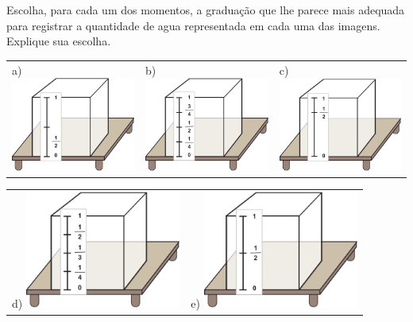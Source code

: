 Escolha, para cada um dos momentos, a graduação que lhe parece mais adequada para registrar a quantidade de agua representada em cada uma das imagens. Explique sua escolha.


     \begin{center}
     \begin{tabular}{m{}m{}m{}}
 \parbox[b][.3cm][t]{.3cm}{a)}  \includegraphics[width=145pt, keepaspectratio]{../figuras/licao03/ativ1_fig05.png} &
 \parbox[b][.3cm][t]{.3cm}{b)}  \includegraphics[width=145pt, keepaspectratio]{../figuras/licao03/ativ1_fig06.png} &
  \parbox[b][.3cm][t]{.3cm}{c)}  \includegraphics[width=145pt, keepaspectratio]{../figuras/licao03/ativ1_fig07.png}
   \end{tabular}

  \begin{tabular}{m{}m{}}
  \parbox[b][0.3cm][t]{.3cm}{d)}  \includegraphics[width=145pt, keepaspectratio]{../figuras/licao03/ativ1_fig08.png}&
  \parbox[b][0.3cm][t]{.3cm}{e)}  \includegraphics[width=145pt, keepaspectratio]{../figuras/licao03/ativ1_fig09.png}
  \end{tabular}
  \end{center}


